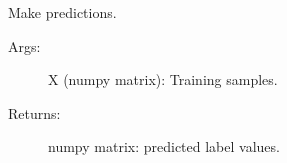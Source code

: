 \documentclass[letterpaper,10pt,english]{sphinxmanual}
\begin{document}
\begin{fulllineitems}
\begin{fulllineitems}
\label{\detokenize{KUHERD:KUHERD.Models.ClassificationModel.predict}}
Make predictions.
\begin{description}
\item[{Args:}] \leavevmode
X (numpy matrix): Training samples.

\item[{Returns:}] \leavevmode
numpy matrix: predicted label values.

\end{description}

\end{fulllineitems}


\end{fulllineitems}

\end{document}
